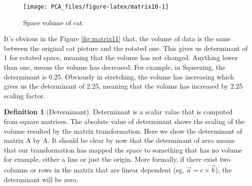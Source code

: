 \documentclass[
]{book}
\newenvironment{Shaded}{\begin{snugshade}}{\end{snugshade}}
\newcommand{\CommentTok}[1]{\textcolor[rgb]{0.56,0.35,0.01}{\textit{#1}}}
\newcommand{\DataTypeTok}[1]{\textcolor[rgb]{0.13,0.29,0.53}{#1}}
\newcommand{\DecValTok}[1]{\textcolor[rgb]{0.00,0.00,0.81}{#1}}
\newcommand{\FloatTok}[1]{\textcolor[rgb]{0.00,0.00,0.81}{#1}}
\newcommand{\KeywordTok}[1]{\textcolor[rgb]{0.13,0.29,0.53}{\textbf{#1}}}
\newcommand{\NormalTok}[1]{#1}
\newcommand{\OperatorTok}[1]{\textcolor[rgb]{0.81,0.36,0.00}{\textbf{#1}}}
\newcommand{\StringTok}[1]{\textcolor[rgb]{0.31,0.60,0.02}{#1}}
\theoremstyle{definition}
\newtheorem{definition}{Definition}[chapter]
\theoremstyle{definition}
\theoremstyle{definition}
\theoremstyle{remark}
\begin{document}
\begin{Shaded}
\begin{Highlighting}[]
{{\NormalTok{bs2<-}\KeywordTok{matrix}\NormalTok{(}\KeywordTok{c}\NormalTok{(}\FloatTok{1.5}\NormalTok{,}\DecValTok{0}\NormalTok{,}\DecValTok{0}\NormalTok{,}\FloatTok{1.5}\NormalTok{),}\DecValTok{2}\NormalTok{)}
\CommentTok{# plot inverse}
\KeywordTok{plot}\NormalTok{(}\KeywordTok{t}\NormalTok{(bs2}\OperatorTok{%*%}\KeywordTok{t}\NormalTok{(}\KeywordTok{as.matrix}\NormalTok{(cat_data))),}\DataTypeTok{xlab=}\StringTok{""}\NormalTok{,}\DataTypeTok{ylab=}\StringTok{""}\NormalTok{,}\DataTypeTok{xlim=}\KeywordTok{c}\NormalTok{(}\OperatorTok{-}\DecValTok{110}\NormalTok{,}\DecValTok{110}\NormalTok{),}\DataTypeTok{ylim=}\KeywordTok{c}\NormalTok{(}\OperatorTok{-}\DecValTok{150}\NormalTok{,}\DecValTok{150}\NormalTok{))}
\CommentTok{# write title}
\KeywordTok{title}\NormalTok{(}\StringTok{"Stretching"}\NormalTok{)}
\end{Highlighting}
\end{Shaded}

\begin{figure}

{\centering \texttt{[image: PCA\_files/figure-latex/matrix10-1]} 

}

\caption{Space volume of cat}\label{fig:matrix10}
\end{figure}

It's obvious in the Figure \ref{fig:matrix11} that, the volume of data is the same between the original cat picture and the rotated one. This gives us determinant of 1 for rotated space, meaning that the volume has not changed. Anything lower than one, means the volume has decreased. For example, in Squeezing, the determinant is 0.25. Obviously in stretching, the volume has increasing which gives us the determinant of 2.25, meaning that the volume has increased by 2.25 scaling factor.

\begin{definition}[Determinant]
\protect\hypertarget{def:det}{}{\label{def:det} \iffalse (Determinant) \fi{} }Determinant is a scalar value that is computed from square matrices. The absolute value of determinant shows the scaling of the volume resulted by the matrix transformation. Here we show the determinant of matrix A by \textbar A\textbar.
It should be clear by now that the determinant of zero means that our transformation has mapped the space to something that has no volume for example, either a line or just the origin. More formally, if there exist two columns or rows in the matrix that are linear dependent (eg. \(\vec{a}=c \times \vec{b}\)), the determinant will be zero.
\end{definition}
\end{document}
